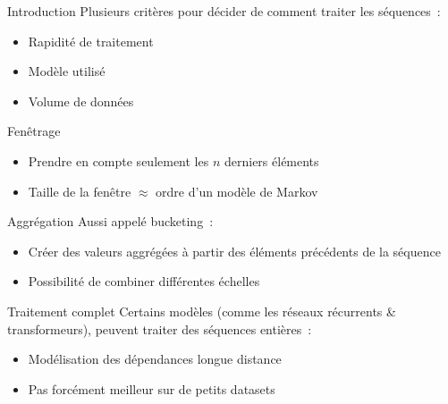 \begin{frame}{Introduction}
  Plusieurs critères pour décider de comment traiter les séquences~:

  \begin{itemize}[<+->]
    \item Rapidité de traitement
    \item Modèle utilisé
    \item Volume de données
  \end{itemize}
\end{frame}

\begin{frame}{Fenêtrage}
  \begin{itemize}[<+->]
    \item Prendre en compte seulement les $n$ derniers éléments
    \item Taille de la fenêtre $\approx$ ordre d'un modèle de Markov
  \end{itemize}
\end{frame}

\begin{frame}{Aggrégation}
  Aussi appelé bucketing~:

  \begin{itemize}[<+->]
    \item Créer des valeurs aggrégées à partir des éléments précédents de la séquence
    \item Possibilité de combiner différentes échelles
  \end{itemize}
\end{frame}

\begin{frame}{Traitement complet}
  Certains modèles (comme les réseaux récurrents \& transformeurs), peuvent traiter des séquences entières~:

  \begin{itemize}[<+->]
    \item Modélisation des dépendances longue distance
    \item Pas forcément meilleur sur de petits datasets
  \end{itemize}
\end{frame}